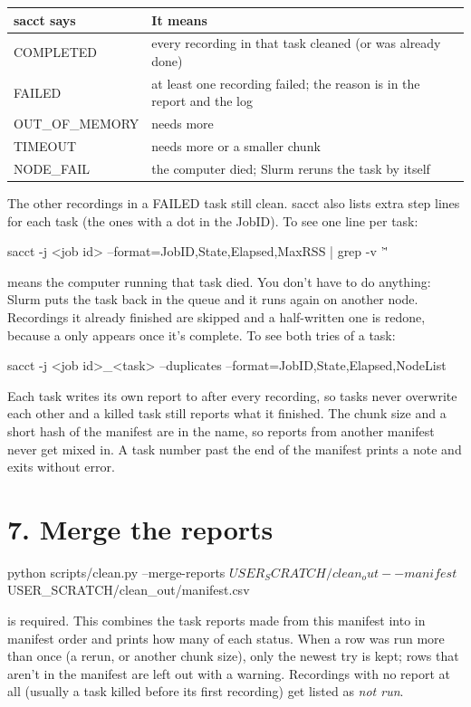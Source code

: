 \begin{tabularx}{\textwidth}{@{}l Y@{}}
\toprule
\textbf{sacct says} & \textbf{It means} \\
\midrule
COMPLETED & every recording in that task cleaned (or was already done) \\
FAILED & at least one recording failed; the reason is in the report and the  log \\
OUT\_OF\_MEMORY & needs more  \\
TIMEOUT & needs more  or a smaller chunk \\
NODE\_FAIL & the computer died; Slurm reruns the task by itself \\
\bottomrule
\end{tabularx}

\medskip
The other recordings in a FAILED task still clean. sacct also lists extra step lines for each task (the ones with a dot in the JobID). To see one line per task:
\begin{codebox}
sacct -j <job id> --format=JobID,State,Elapsed,MaxRSS | grep -v '\.'
\end{codebox}
 means the computer running that task died. You don't have to do anything: Slurm puts the task back in the queue and it runs again on another node. Recordings it already finished are skipped and a half-written one is redone, because a  only appears once it's complete. To see both tries of a task:
\begin{codebox}
sacct -j <job id>_<task> --duplicates --format=JobID,State,Elapsed,NodeList
\end{codebox}

\medskip
Each task writes its own report to  after every recording, so tasks never overwrite each other and a killed task still reports what it finished. The chunk size and a short hash of the manifest are in the name, so reports from another manifest never get mixed in. A task number past the end of the manifest prints a note and exits without error.

\section{7. Merge the reports}
\begin{codebox}
python scripts/clean.py --merge-reports $USER_SCRATCH/clean_out --manifest $USER_SCRATCH/clean_out/manifest.csv
\end{codebox}
 is required. This combines the task reports made from this manifest into  in manifest order and prints how many of each status. When a row was run more than once (a rerun, or another chunk size), only the newest try is kept; rows that aren't in the manifest are left out with a warning. Recordings with no report at all (usually a task killed before its first recording) get listed as \textit{not run}.

